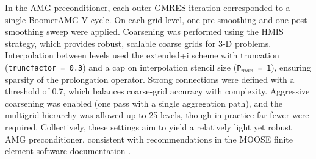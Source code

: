 \documentclass[sn-mathphys,Numbered]{sn-jnl}%
\begin{document}
In the AMG preconditioner, each outer GMRES iteration corresponded to a single BoomerAMG V-cycle.
On each grid level, one pre-smoothing and one post-smoothing sweep were applied.
Coarsening was performed using the HMIS strategy, which provides robust, scalable coarse grids for 3-D problems. Interpolation between levels used the extended+i scheme with truncation (\texttt{truncfactor = 0.3}) and a cap on interpolation stencil size (\texttt{P$_{max}$ = 1}), ensuring sparsity of the prolongation operator. Strong connections were defined with a threshold of 0.7, which balances coarse-grid accuracy with complexity. Aggressive coarsening was enabled (one pass with a single aggregation path), and the multigrid hierarchy was allowed up to 25 levels, though in practice far fewer were required.
Collectively, these settings aim to yield a relatively light yet robust AMG preconditioner, consistent with recommendations in the MOOSE finite element software documentation \citep{moose_hypre_doc_2022}.
\end{document}
